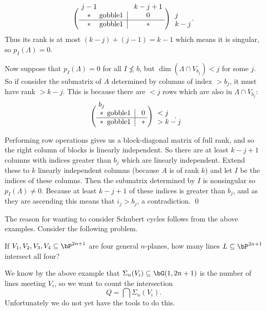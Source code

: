    \medskip
    $$ \left(\vcenter{\halign{\strut\hfil$#$\hfil&\@gobble{#1}\kern.2cm\vrule\kern.2cm&\hfil$#$\hfil&\rlap{\kern.5cm$#$}\cr
        \omit\hfil\rmht{\ $j-1$\ }\hfil&\omit&\omit\hfil\rmht{\ $k-j+1$\ }\hfil\cr
        *&&0&j\cr\noalign{\hrule}
        *&&*&k-j\cr
    }}\right)\kern1cm . $$
    Thus its rank is at most $(k-j)+(j-1)=k-1$ which means it is singular, so $p_I(\Lambda)=0$.

    Now suppose that $p_I(\Lambda)=0$ for all $I\not\leq b$, but $\dim(\Lambda\cap V_{b_j})<j$ for some $j$.
    So if consider the submatrix of $A$ determined by columns of index $>b_j$, it must have rank $>k-j$.
    This is because there are $<j$ rows which are also in $\Lambda\cap V_{b_j}$:

    \medskip
    $$ \left(\vcenter{\halign{\strut\hfil$#$\hfil&\@gobble{#1}\kern.2cm\vrule\kern.2cm&\hfil$#$\hfil&\rlap{\kern.5cm$#$}\cr
        \omit\hfil\rmht{\ $b_j$\ }\hfil\cr
        *&&\ 0\ &<j\cr\noalign{\hrule}
        *&&*&>k-j\cr
    }}\right)\kern1cm . $$

    Performing row operations gives us a block-diagonal matrix of full rank, and so the right column of blocks
    is linearly independent.
    So there are at least $k-j+1$ columns with indices greater than $b_j$ which are linearly independent.
    Extend these to $k$ linearly independent columns (because $A$ is of rank $k$) and let $I$ be the
    indices of these columns.
    Then the submatrix determined by $I$ is nonsingular so $p_I(\Lambda)\neq0$.
    Because at least $k-j+1$ of these indices is greater than $b_j$, and as they are ascending this means
    that $i_j>b_j$, a contradiction.
    \qed

\eproof

The reason for wanting to consider Schubert cycles follows from the above examples.
Consider the following problem.

\bprob[name={interfourq}]

    If $V_1,V_2,V_3,V_4\subseteq\bP^{2n+1}$ are four general $n$-planes, how many lines $L\subseteq\bP^{2n+1}$
    intersect all four?

\eprob

We know by the above example that $\Sigma_n(V_i)\subseteq\bG(1,2n+1)$ is the number of lines meeting $V_i$,
so we want to count the intersection
$$ Q = \bigcap\Sigma_n(V_i) . $$
Unfortunately we do not yet have the tools to do this.

